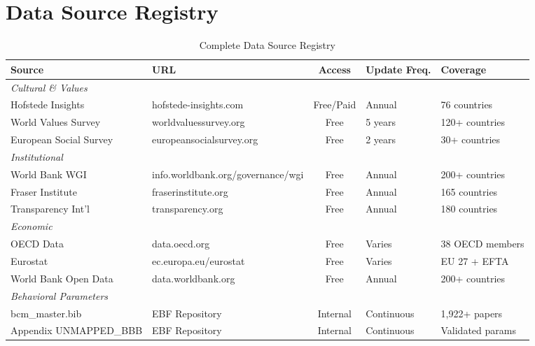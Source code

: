 \section{Data Source Registry}
\label{sec:dr-source-registry}

\begin{table}[htbp]
\centering
\caption{Complete Data Source Registry}
\label{tab:dr-source-registry}
\renewcommand{\arraystretch}{1.2}
\scriptsize
\begin{tabular}{@{}p{2.5cm}p{3cm}cp{2cm}p{3cm}@{}}
\toprule
\textbf{Source} & \textbf{URL} & \textbf{Access} & \textbf{Update Freq.} & \textbf{Coverage} \\
\midrule
\multicolumn{5}{l}{\textit{Cultural \& Values}} \\
Hofstede Insights & hofstede-insights.com & Free/Paid & Annual & 76 countries \\
World Values Survey & worldvaluessurvey.org & Free & 5 years & 120+ countries \\
European Social Survey & europeansocialsurvey.org & Free & 2 years & 30+ countries \\
\midrule
\multicolumn{5}{l}{\textit{Institutional}} \\
World Bank WGI & info.worldbank.org/governance/wgi & Free & Annual & 200+ countries \\
Fraser Institute & fraserinstitute.org & Free & Annual & 165 countries \\
Transparency Int'l & transparency.org & Free & Annual & 180 countries \\
\midrule
\multicolumn{5}{l}{\textit{Economic}} \\
OECD Data & data.oecd.org & Free & Varies & 38 OECD members \\
Eurostat & ec.europa.eu/eurostat & Free & Varies & EU 27 + EFTA \\
World Bank Open Data & data.worldbank.org & Free & Annual & 200+ countries \\
\midrule
\multicolumn{5}{l}{\textit{Behavioral Parameters}} \\
bcm\_master.bib & EBF Repository & Internal & Continuous & 1,922+ papers \\
Appendix UNMAPPED_BBB & EBF Repository & Internal & Continuous & Validated params \\
\bottomrule
\end{tabular}
\end{table}


